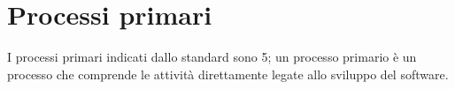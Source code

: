 \section{Processi primari}
I processi primari indicati dallo standard \cite{bib:ISO12207_1997} sono 5; un processo primario è un processo che comprende le attività direttamente legate allo sviluppo del software.

